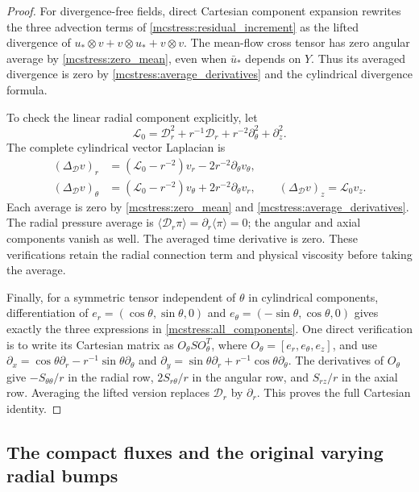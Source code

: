 \documentclass[11pt]{article}
\begin{document}
\begin{proof}
For divergence-free fields, direct Cartesian component expansion
rewrites the three advection terms of \eqref{mcstress:residual_increment}
as the lifted divergence of
$u_*\otimes v+v\otimes u_*+v\otimes v$.
The mean-flow cross tensor has zero angular average by
\eqref{mcstress:zero_mean}, even when $\bar u_*$ depends on $Y$.
Thus its averaged divergence is zero by
\eqref{mcstress:average_derivatives} and the cylindrical divergence
formula.

To check the linear radial component explicitly, let
\[
 \mathscr L_0=\mathscr D_r^2+r^{-1}\mathscr D_r
             +r^{-2}\partial_\theta^2+\partial_z^2.
\]
The complete cylindrical vector Laplacian is
\[
 \begin{aligned}
 (\Delta_{\mathscr D}v)_r&=(\mathscr L_0-r^{-2})v_r
                       -2r^{-2}\partial_\theta v_\theta,\\
 (\Delta_{\mathscr D}v)_\theta&=(\mathscr L_0-r^{-2})v_\theta
                       +2r^{-2}\partial_\theta v_r,\qquad
 (\Delta_{\mathscr D}v)_z=\mathscr L_0v_z.
 \end{aligned}
\]
Each average is zero by \eqref{mcstress:zero_mean} and
\eqref{mcstress:average_derivatives}. The radial pressure average is
$\langle\mathscr D_r\pi\rangle=\partial_r\langle\pi\rangle=0$;
the angular and axial components vanish as well. The averaged time
derivative is zero. These verifications retain the radial connection
term and physical viscosity before taking the average.

Finally, for a symmetric tensor independent of $\theta$ in cylindrical
components, differentiation of
$e_r=(\cos\theta,\sin\theta,0)$ and
$e_\theta=(-\sin\theta,\cos\theta,0)$ gives exactly the three
expressions in \eqref{mcstress:all_components}. One direct verification
is to write its Cartesian matrix as $O_\theta S O_\theta^T$, where
$O_\theta=[e_r,e_\theta,e_z]$, and use
$\partial_x=\cos\theta\partial_r-r^{-1}\sin\theta\partial_\theta$
and $\partial_y=\sin\theta\partial_r+r^{-1}\cos\theta\partial_\theta$.
The derivatives of $O_\theta$ give $-S_{\theta\theta}/r$ in the radial
row, $2S_{r\theta}/r$ in the angular row, and $S_{rz}/r$ in the axial
row. Averaging the lifted version replaces $\mathscr D_r$ by
$\partial_r$. This proves the full Cartesian identity.
\end{proof}

\subsection{The compact fluxes and the original varying radial bumps}
\end{document}
